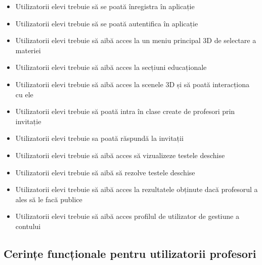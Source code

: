 \begin{itemize}
    \item Utilizatorii elevi trebuie să se poată înregistra în aplicație
    \item Utilizatorii elevi trebuie să se poată autentifica în aplicație
    \item Utilizatorii elevi trebuie să aibă acces la un meniu principal 3D de selectare a materiei
    \item Utilizatorii elevi trebuie să aibă acces la secțiuni educaționale
    \item Utilizatorii elevi trebuie să aibă acces la scenele 3D și să poată interacționa cu ele
    \item Utilizatorii elevi trebuie să poată intra în clase create de profesori prin invitație
    \item Utilizatorii elevi trebuie sa poată răspundă la invitații
    \item Utilizatorii elevi trebuie să aibă acces să vizualizeze testele deschise
    \item Utilizatorii elevi trebuie să aibă să rezolve testele deschise
    \item Utilizatorii elevi trebuie să aibă acces la rezultatele obținute dacă profesorul a ales să le facă publice
    \item Utilizatorii elevi trebuie să aibă acces profilul de utilizator de gestiune a contului
\end{itemize}

\subsection{Cerințe funcționale pentru utilizatorii profesori}
\label{sub-sec:proj-requirements-teachers}

